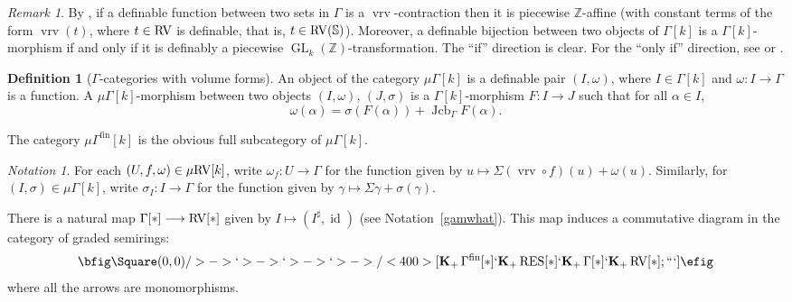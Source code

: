\documentclass[12pt]{amsart}
\theoremstyle{plain}
\theoremstyle{definition}
\newtheorem{defn}[thm]{Definition}
\theoremstyle{remark}
\newtheorem{rem}[thm]{Remark}
\newtheorem{nota}[thm]{Notation}
\numberwithin{equation}{section}
\theoremstyle{plain}
\newcommand{\RV}{\textup{RV}}
\DeclareMathOperator{\id}{id}
\DeclareMathOperator{\mgl}{GL}
\DeclareMathOperator{\jcb}{Jcb}
\newcommand{\Z}{\mathds{Z}}
\newcommand{\0}{\emptyset}
\newcommand{\fun}{\longrightarrow}
\newcommand{\efun}{\longmapsto}
\newcommand{\mgRV}{{\mu}{\RV}}
\newcommand{\mG}{{\mu}{\Gamma}}
\newcommand{\RES}{\textup{RES}}
\DeclareMathOperator{\gsk}{\mathbf{K}_+}
\DeclareMathOperator{\fin}{fin}
\DeclareMathOperator{\vrv}{vrv}
\begin{document}
\begin{rem}\label{GLZ:char}
By \cite[Remark~2.28]{Yin:int:expan:acvf}, if a definable function between two sets in $\Gamma$ is a $\vrv$-contraction then it is piecewise $\Z$-affine (with constant terms of the form $\vrv(t)$, where $t \in \RV$ is definable, that is, $t \in \RV(\mathbb{S})$). Moreover,  a definable bijection  between two objects of $\Gamma[k]$ is a  $\Gamma[k]$-morphism if and only if it is definably a piecewise $\mgl_k(\Z)$-transformation. The ``if'' direction is clear. For the ``only if'' direction, see \cite[Lemma~10.1]{hrushovski:kazhdan:integration:vf} or \cite[Lemma~2.29]{Yin:int:expan:acvf}.
\end{rem}


\begin{defn}[$\Gamma$-categories with volume forms]\label{def:Ga:cat:mu}
An object of the category $\mG[k]$ is a definable pair $(I, \omega)$, where $I \in \Gamma[k]$ and $\omega : I \fun \Gamma$ is a function. A $\mG[k]$-morphism between two objects $(I, \omega)$, $(J, \sigma)$ is a $\Gamma[k]$-morphism $F : I \fun J$ such that for all $\alpha  \in I$,
\[
\omega(\alpha) = \sigma(F(\alpha)) + \jcb_{\Gamma} F(\alpha).
\]

The category $\mG^{\fin}[k]$ is the obvious full subcategory of $\mG[k]$.
\end{defn}

\begin{nota}\label{comp:form}
For each $(U, f, \omega) \in \mgRV[k]$, write $\omega_f : U \fun \Gamma$ for the function given by $u \efun \Sigma(\vrv \circ f)(u) + \omega(u)$. Similarly, for $(I, \sigma) \in \mG[k]$, write $\sigma_I : I \fun \Gamma$ for the function given by $\gamma \efun \Sigma \gamma + \sigma(\gamma)$.
\end{nota}

%

There is a natural map $\Gamma[*] \fun \RV[*]$ given by $I \efun (I^\sharp, \id)$ (see Notation~\ref{gamwhat}). This map induces a commutative diagram in the category of graded semirings:
\[
\bfig
 \Square(0,0)/>->`>->`>->`>->/<400>[{\gsk \Gamma^{\fin}[*]}`{\gsk \RES[*]}`{\gsk \Gamma[*]}`{\gsk \RV[*]}; ```]
\efig
\]
where all the arrows are monomorphisms.
\end{document}
